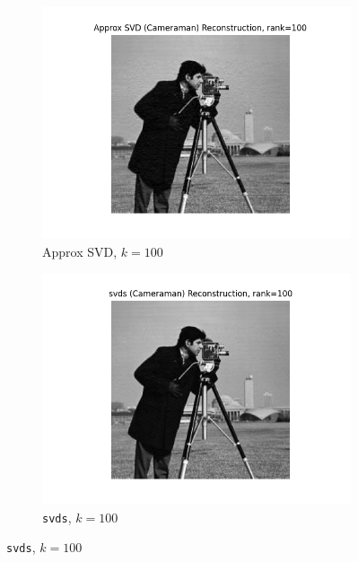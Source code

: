 \documentclass[11pt,a4paper, margin=1in]{article}
\begin{document}
\begin{enumerate}
\begin{figure}[H]
      \vspace{0.5em} %
    
      \begin{subfigure}[b]{0.35\textwidth}
          \centering
          \includegraphics[width=\textwidth]{Approx SVD (Cameraman)_reconstruction_rank_100.png}
          \caption{Approx SVD, $k=100$}
      \end{subfigure}
      \hfill
      \begin{subfigure}[b]{0.35\textwidth}
          \centering
          \includegraphics[width=\textwidth]{svds (Cameraman)_reconstruction_rank_100.png}
          \caption{\texttt{svds}, $k=100$}
      \end{subfigure}


\end{figure}
\end{enumerate}
\end{document}
